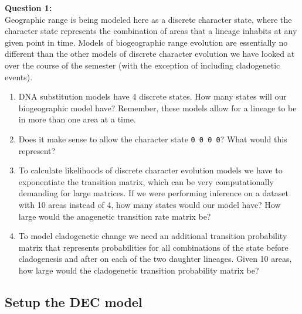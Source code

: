 \documentclass[11pt]{article}
\begin{document}
\begin{framed}
\noindent
\textbf{Question 1:} \\
Geographic range is being modeled here as a discrete character state,
where the character state represents the combination of areas
that a lineage inhabits at any given point in time.
Models of biogeographic range evolution are essentially no different than the other
models of discrete character evolution we have looked at
over the course of the semester (with the exception of
including cladogenetic events).
\begin{enumerate}
\item DNA substitution models have 4 discrete states. How many states
      will our biogeographic model have? Remember, 
      these models allow for a lineage to be in more than one
      area at a time.
\item Does it make sense to allow the character state \texttt{0 0 0 0}?
      What would this represent?
\item To calculate likelihoods of discrete character evolution models
      we have to exponentiate the transition matrix, which can be very
      computationally demanding for large matrices. 
      If we were performing inference on a dataset with 10 areas
        instead of 4, how many states would our model have?
        How large would the anagenetic transition rate matrix be?
\item To model cladogenetic change we need an additional transition 
        probability matrix that represents probabilities for all
        combinations of the state before cladogenesis 
        and after on each of the two daughter lineages.
        Given 10 areas, how large would the cladogenetic transition probability matrix be?
\end{enumerate}
\end{framed}

\subsection{Setup the DEC model}
\end{document}

